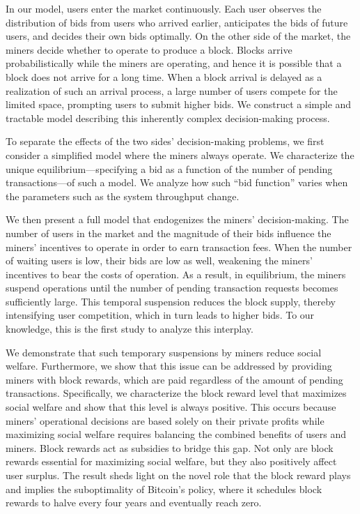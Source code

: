 \documentclass[12pt, letterpaper]{article}
\begin{document}
In our model, users enter the market continuously. Each user observes the distribution of bids from users who arrived earlier, anticipates the bids of future users, and decides their own bids optimally.
On the other side of the market, the miners decide whether to operate to produce a block. Blocks arrive probabilistically while the miners are operating, and hence it is possible that a block does not arrive for a long time. When a block arrival is delayed as a realization of such an arrival process, a large number of users compete for the limited space, prompting users to submit higher bids. We construct a simple and tractable model describing this inherently complex decision-making process. 

To separate the effects of the two sides' decision-making problems, we first consider a simplified model where the miners always operate. We characterize the unique equilibrium---specifying a bid as a function of the number of pending transactions---of such a model. We analyze how such ``bid function'' varies when the parameters such as the system throughput change.

We then present a full model that endogenizes the miners' decision-making. The number of users in the market and the magnitude of their bids influence the miners' incentives to operate in order to earn transaction fees. When the number of waiting users is low, their bids are low as well, weakening the miners' incentives to bear the costs of operation. As a result, in equilibrium, the miners suspend operations until the number of pending transaction requests becomes sufficiently large. This temporal suspension reduces the block supply, thereby intensifying user competition, which in turn leads to higher bids. To our knowledge, this is the first study to analyze this interplay.


We demonstrate that such temporary suspensions by miners reduce social welfare. Furthermore, we show that this issue can be addressed by providing miners with block rewards, which are paid regardless of the amount of pending transactions. Specifically, we characterize the block reward level that maximizes social welfare and show that this level is always positive. This occurs because miners' operational decisions are based solely on their private profits while maximizing social welfare requires balancing the combined benefits of users and miners. Block rewards act as subsidies to bridge this gap. Not only are block rewards essential for maximizing social welfare, but they also positively affect user surplus. The result sheds light on the novel role that the block reward plays and implies the suboptimality of Bitcoin’s policy, where it schedules block rewards to halve every four years and eventually reach zero.
\end{document}
